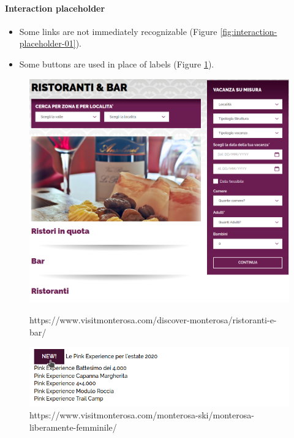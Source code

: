 \documentclass[a4paper, 11pt, parskip=half, headsepline]{scrreprt}
\begin{document}
\paragraph{Interaction placeholder}
\begin{itemize}
    \item Some links are not immediately recognizable (Figure \ref{fig:interaction-placeholder-01}).
    \item Some buttons are used in place of labels (Figure \ref{fig:interaction-placeholder-02}).
\end{itemize}

\begin{figure}[H]
    \begin{minipage}[t]{0.5\textwidth}
        \centering
        \includegraphics[width=1\linewidth, keepaspectratio]{81-interaction-placeholders-links}
        \caption{https://www.visitmonterosa.com/discover-monterosa/ristoranti-e-bar/}
        \label{fig:interaction-placeholder-01}
    \end{minipage}   
    \hspace*{\fill}
    \begin{minipage}[t]{0.5\textwidth}
        \centering
        \includegraphics[width=1\linewidth, keepaspectratio]{82-interaction-placeholders-labels}
        \caption{https://www.visitmonterosa.com/monterosa-ski/monterosa-liberamente-femminile/}
        \label{fig:interaction-placeholder-02}
    \end{minipage} 
\end{figure}
\end{document}
